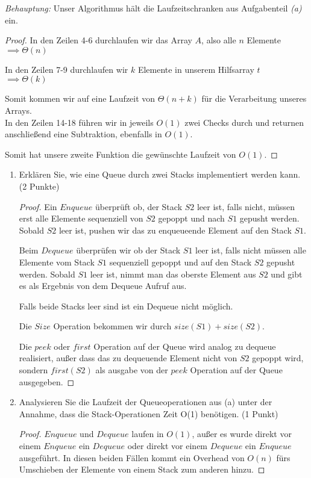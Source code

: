 \documentclass[ngerman,landscape,twocolumn]{adtexsheet}
\begin{document}
\emph{Behauptung:} Unser Algorithmus hält die Laufzeitschranken aus Aufgabenteil \emph{(a)} ein.
\begin{proof}
    In den Zeilen 4-6 durchlaufen wir das Array $A$, also alle $n$ Elemente\\
    $\implies \Theta(n)$
    
    In den Zeilen 7-9 durchlaufen wir $k$ Elemente in unserem Hilfsarray $t$\\
    $\implies \Theta(k)$
    
    Somit kommen wir auf eine Laufzeit von $\Theta(n+k)$ für die Verarbeitung unseres Arrays.\\
    In den Zeilen 14-18 führen wir in jeweils $O(1)$ zwei Checks durch und returnen anschließend eine Subtraktion, ebenfalls in $O(1)$.
    
    Somit hat unsere zweite Funktion die gewünschte Laufzeit von $O(1)$.
\end{proof}
\begin{question}
    \begin{enumerate}
        \item Erklären Sie, wie eine Queue durch zwei Stacks implementiert werden kann. (2 Punkte)
        
        \begin{proof}
            Ein $Enqueue$ überprüft ob, der Stack $S2$ leer ist, falls nicht, müssen erst alle Elemente sequenziell von $S2$ gepoppt und nach $S1$ gepusht werden. Sobald $S2$ leer ist, pushen wir das zu enqueueende Element auf den Stack $S1$.
            
            Beim $Dequeue$ überprüfen wir ob der Stack $S1$ leer ist, falls nicht müssen alle Elemente vom Stack $S1$ sequenziell gepoppt und auf den Stack $S2$ gepusht werden. Sobald $S1$ leer ist, nimmt man das oberste Element aus $S2$ und gibt es als Ergebnis von dem Dequeue Aufruf aus.
            
            Falls beide Stacks leer sind ist ein Dequeue nicht möglich.
            
            Die $Size$ Operation bekommen wir durch $size(S1) + size(S2)$.
            
            Die $peek$ oder $first$ Operation auf der Queue wird analog zu dequeue realisiert, außer dass das zu dequeuende Element nicht von $S2$ gepoppt wird, sondern $first(S2)$ als ausgabe von der $peek$ Operation auf der Queue ausgegeben.
        \end{proof}
        \item Analysieren Sie die Laufzeit der Queueoperationen aus (a) unter der Annahme, dass die Stack-Operationen Zeit O(1) benötigen. (1 Punkt)
        \begin{proof}
            $Enqueue$ und $Dequeue$ laufen in $O(1)$, außer es wurde direkt vor einem $Enqueue$ ein $Dequeue$ oder direkt vor einem $Dequeue$ ein $Enqueue$ ausgeführt. In diesen beiden Fällen kommt ein Overhead von $O(n)$ fürs Umschieben der Elemente von einem Stack zum anderen hinzu.
        \end{proof}
    \end{enumerate} 
\end{question}
\end{document}
